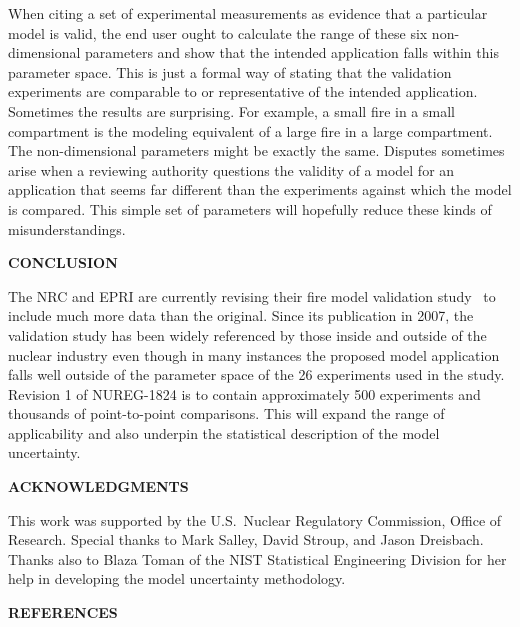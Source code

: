 \documentclass[fleqn,b5paper]{article}
\begin{document}
When citing a set of experimental measurements as evidence that a particular model is valid, the end user ought to calculate the range of these six non-dimensional parameters and show that the intended application falls within this parameter space. This is just a formal way of stating that the validation experiments are comparable to or representative of the intended application. Sometimes the results are surprising. For example, a small fire in a small compartment is the modeling equivalent of a large fire in a large compartment. The non-dimensional parameters might be exactly the same. Disputes sometimes arise when a reviewing authority questions the validity of a model for an application that seems far different than the experiments against which the model is compared. This simple set of parameters will hopefully reduce these kinds of misunderstandings.


\vspace{\parskip}
{\bf CONCLUSION}

The NRC and EPRI are currently revising their fire model validation study~\cite{NUREG_1824} to include much more data than the original. Since its publication in 2007, the validation study has been widely referenced by those inside and outside of the nuclear industry even though in many instances the proposed model application falls well outside of the parameter space of the 26 experiments used in the study. Revision 1 of NUREG-1824 is to contain approximately 500 experiments and thousands of point-to-point comparisons. This will expand the range of applicability and also underpin the statistical description of the model uncertainty.

\vspace{\parskip}
{\bf ACKNOWLEDGMENTS}

This work was supported by the U.S.~Nuclear Regulatory Commission, Office of Research. Special thanks to Mark Salley, David Stroup, and Jason Dreisbach. Thanks also to Blaza Toman of the NIST Statistical Engineering Division for her help in developing the model uncertainty methodology.

\vspace{\parskip}
{\bf REFERENCES}
\vspace{-0.5in}

\renewcommand{\refname}{}
%
\end{document}
